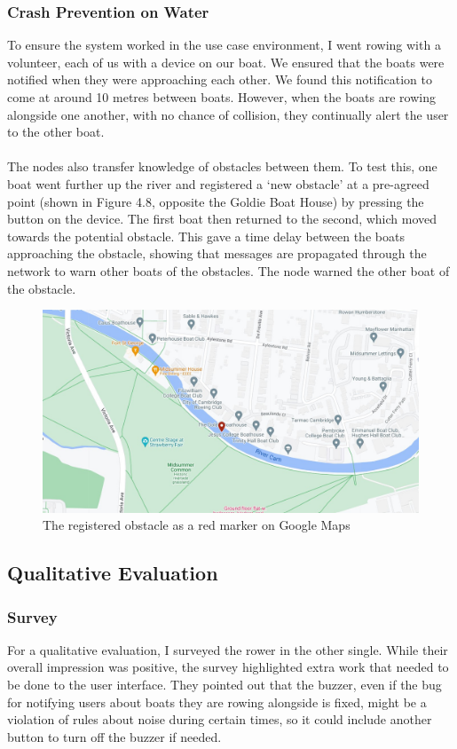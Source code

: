 \documentclass[12pt,a4paper]{report}
\begin{document}
\subsubsection{Crash Prevention on Water}
To ensure the system worked in the use case environment, I went rowing with a volunteer, each of us with a device on our boat. We ensured that the boats were notified when they were approaching each other. We found this notification to come at around 10 metres between boats. However, when the boats are rowing alongside one another, with no chance of collision, they continually alert the user to the other boat. \\ \\ %
The nodes also transfer knowledge of obstacles between them. To test this, one boat went further up the river and registered a `new obstacle' at a pre-agreed point (shown in Figure 4.8, opposite the Goldie Boat House) by pressing the button on the device. The first boat then returned to the second, which moved towards the potential obstacle. This gave a time delay between the boats approaching the obstacle, showing that messages are propagated through the network to warn other boats of the obstacles. The node warned the other boat of the obstacle. 
\begin{figure}[h]
\begin{center}
\includegraphics[scale=0.3]{obstacle.jpg}
\end{center}
\caption{The registered obstacle as a red marker on Google Maps \cite{googlemapsgeneral}}
\end{figure}

\subsection{Qualitative Evaluation}
\subsubsection{Survey}
For a qualitative evaluation, I surveyed the rower in the other single. While their overall impression was positive, the survey highlighted extra work that needed to be done to the user interface. They pointed out that the buzzer, even if the bug for notifying users about boats they are rowing alongside is fixed, might be a violation of rules about noise during certain times, so it could include another button to turn off the buzzer if needed.
\end{document}
